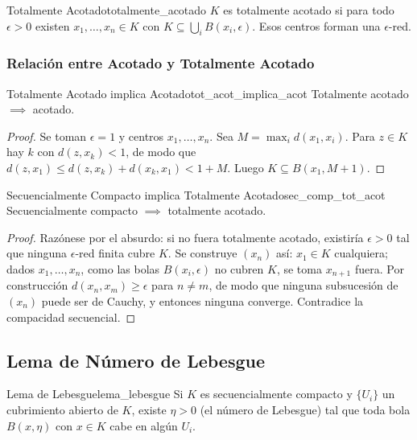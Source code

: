 \documentclass[11pt, a4paper]{article}
\begin{document}
\begin{definicion}{Totalmente Acotado}{totalmente_acotado}
$K$ es totalmente acotado si para todo $\epsilon > 0$ existen $x_1, \dots, x_n \in K$ con
$K \subseteq \bigcup_i B(x_i, \epsilon)$. Esos centros forman una $\epsilon$-red.
\end{definicion}

\subsubsection{Relación entre Acotado y Totalmente Acotado}

\begin{proposicion}{Totalmente Acotado implica Acotado}{tot_acot_implica_acot}
Totalmente acotado $\implies$ acotado.
\end{proposicion}

\begin{proof}
Se toman $\epsilon = 1$ y centros $x_1, \dots, x_n$. Sea $M = \max_i d(x_1, x_i)$.
Para $z \in K$ hay $k$ con $d(z, x_k) < 1$,
de modo que $d(z, x_1) \le d(z, x_k) + d(x_k, x_1) < 1 + M$.
Luego $K \subseteq B(x_1, M+1)$.
\end{proof}

\begin{proposicion}{Secuencialmente Compacto implica Totalmente Acotado}{sec_comp_tot_acot}
Secuencialmente compacto $\implies$ totalmente acotado.
\end{proposicion}

\begin{proof}
Razónese por el absurdo: si no fuera totalmente acotado, existiría $\epsilon > 0$ tal que ninguna
$\epsilon$-red finita cubre $K$.
Se construye $(x_n)$ así: $x_1 \in K$ cualquiera; dados $x_1, \dots, x_n$,
como las bolas $B(x_i, \epsilon)$ no cubren $K$, se toma $x_{n+1}$ fuera.
Por construcción $d(x_n, x_m) \ge \epsilon$ para $n \ne m$,
de modo que ninguna subsucesión de $(x_n)$ puede ser de Cauchy, y entonces ninguna converge.
Contradice la compacidad secuencial.
\end{proof}

\subsection{Lema de Número de Lebesgue}

\begin{proposicion}{Lema de Lebesgue}{lema_lebesgue}
Si $K$ es secuencialmente compacto y $\{U_i\}$ un cubrimiento abierto de $K$, existe $\eta > 0$ (el
número de Lebesgue) tal que toda bola $B(x, \eta)$ con $x \in K$ cabe en algún $U_i$.
\end{proposicion}
\end{document}
